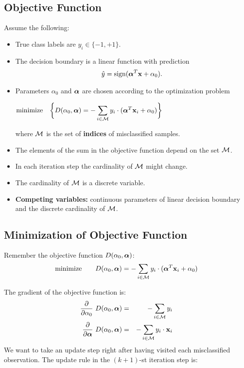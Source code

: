 \subsection{Objective Function}

  Assume the following:
  \begin{itemize}
    \item True class labels are $y_i\in\{-1,+1\}$.
    \item The decision boundary is a linear function with prediction
      \begin{displaymath}
        \hat y = \operatorname{sign}(\bm{\mathrm{\alpha}}^T\bm{\mathrm{x}} + \alpha_0).
      \end{displaymath}
    \item Parameters $\alpha_0$ and $\bm{\mathrm{\alpha}}$ are chosen according to the optimization problem 
      \begin{center}
        $\displaystyle \mbox{minimize} \quad \bigg\{ D(\alpha_0, \bm{\mathrm{\alpha}})= -\sum_{i\in {\cal M}} y_i \cdot (\bm{\mathrm{\alpha}}^T\bm{\mathrm{x}}_i + \alpha_0) \bigg\}$
      \end{center}
      where $\cal M$ is the set of \textbf{indices} of misclassified samples.
     \item The elements of the sum in the objective function depend on the set $\cal M$.          
    \item In each iteration step the cardinality of $\cal M$ might change.          
    \item The cardinality of $\cal M$ is a discrete variable.
    \item \textbf{Competing variables:} continuous parameters of linear decision boundary and the discrete cardinality of $\cal M$.
  \end{itemize}
 
\subsection{Minimization of Objective Function}

  Remember the objective function $D(\alpha_0, \bm{\mathrm{\alpha}})$:
  \begin{displaymath}
    \mbox{minimize} \quad \quad D(\alpha_0, \bm{\mathrm{\alpha}})= -\sum_{i\in {\cal M}} y_i \cdot (\bm{\mathrm{\alpha}}^T\bm{\mathrm{x}}_i + \alpha_0)
  \end{displaymath}
 
  The gradient of the objective function is:          
  \begin{eqnarray*}
    \frac{\partial}{\partial \alpha_0} \ D(\alpha_0, \bm{\mathrm{\alpha}})&=&  -\sum_{i\in {\cal M}} y_i \\          
    \frac{\partial}{\partial \bm{\mathrm{\alpha}}} \ D(\alpha_0, \bm{\mathrm{\alpha}})&=& -\sum_{i\in {\cal M}} y_i\cdot  \bm{\mathrm{x}}_i \\
  \end{eqnarray*}
  We want to take an update step right after having visited each misclassified observation.
  The update rule in the $(k+1)$-st iteration step is:

